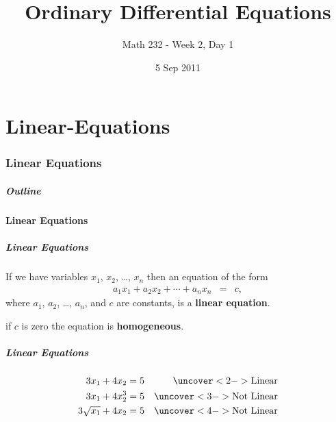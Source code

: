 \part{Linear-Equations}
\section{Linear Equations}


\title{Ordinary Differential Equations}
\subtitle{Math 232 - Week 2, Day 1}
\date{5 Sep 2011}

\begin{frame}
  \titlepage
\end{frame}

\begin{frame}
  \frametitle{Outline}
\end{frame}


\subsection{Linear Equations}


\begin{frame}
  \frametitle{Linear Equations}

  If we have variables $x_1$, $x_2$, \ldots, $x_n$ then an equation of
  the form
  \begin{eqnarray*}
    a_1 x_1 + a_2 x_2 + \cdots + a_n x_n & = & c,
  \end{eqnarray*}
  where $a_1$, $a_2$, \ldots, $a_n$, and $c$ are constants, is a
  \textbf{linear equation}.

  if $c$ is zero the equation is \textbf{homogeneous}.

\end{frame}


\begin{frame}
  \frametitle{Linear Equations}

  \begin{eqnarray*}
    3 x_1 + 4 x_2 = 5 & & \uncover<2->{\mathrm{Linear}} \\
    3 x_1 + 4 x^3_2 = 5 & & \uncover<3->{\mathrm{Not~Linear}} \\
    3 \sqrt{x_1} + 4 x_2 = 5 & & \uncover<4->{\mathrm{Not~Linear}} \\
  \end{eqnarray*}


\end{frame}



